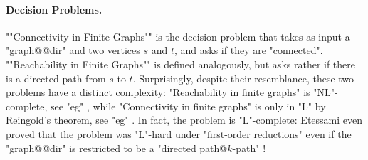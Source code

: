 \paragraph*{Decision Problems.}
\AP""Connectivity in Finite Graphs"" is the decision problem
that takes as input a "graph@@dir" and two vertices $s$ and $t$,
and asks if they are "connected".
\AP ""Reachability in Finite Graphs"" is defined analogously,
but asks rather if there is a directed path from $s$ to $t$.
Surprisingly, despite their resemblance, these two problems have a distinct complexity:
"Reachability in finite graphs" is "NL"-complete, see "eg"
\cite[Theorem~4.18]{AroraBarak2009ComputationalComplexity}, while "Connectivity in finite graphs"
is only in "L" by Reingold's theorem, see "eg"
\cite[Theorem~21.21]{AroraBarak2009ComputationalComplexity}.
In fact, the problem is "L"-complete:
Etessami even proved that the problem
was "L"-hard under "first-order reductions" even if the "graph@@dir" is restricted to
be a "directed path@$k$-path" \cite[Theorem 3.2]{Etessami1997CountingLogSpace}!